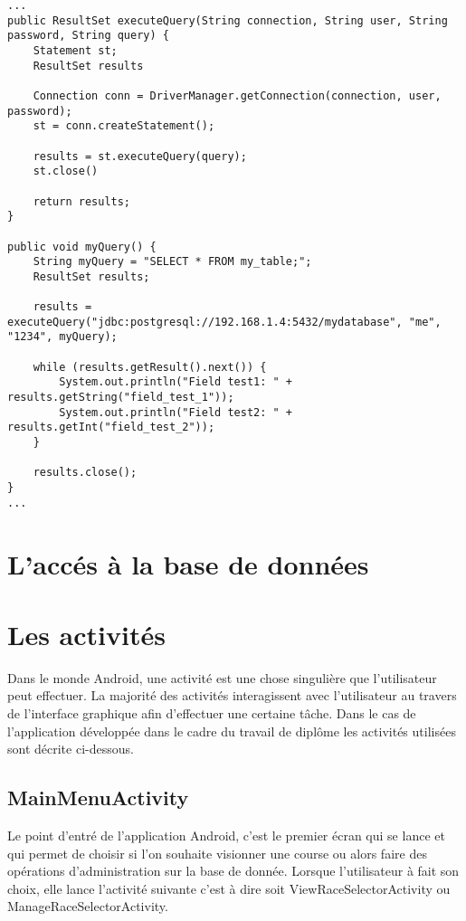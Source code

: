 \begin{lstlisting}[style=JavaStyle]
...
public ResultSet executeQuery(String connection, String user, String password, String query) {
	Statement st;
	ResultSet results

	Connection conn = DriverManager.getConnection(connection, user, password);
	st = conn.createStatement();
	
	results = st.executeQuery(query);
	st.close()	
	
	return results;
}

public void myQuery() {
	String myQuery = "SELECT * FROM my_table;";
	ResultSet results;
	
	results = executeQuery("jdbc:postgresql://192.168.1.4:5432/mydatabase", "me", "1234", myQuery);
	
	while (results.getResult().next()) {
		System.out.println("Field test1: " + results.getString("field_test_1"));
		System.out.println("Field test2: " + results.getInt("field_test_2"));
	}
	
	results.close();	
}
...
\end{lstlisting}

\section{L'accés à la base de données}


\section{Les activités}

Dans le monde Android, une activité est une chose singulière que l'utilisateur peut effectuer. La majorité des activités interagissent avec l'utilisateur au travers de l'interface graphique afin d'effectuer une certaine tâche.  Dans le cas de l'application développée dans le cadre du travail de diplôme les activités utilisées sont décrite ci-dessous.

\subsection{MainMenuActivity}

Le point d'entré de l'application Android, c'est le premier écran qui se lance et qui permet de choisir si l'on souhaite visionner une course ou alors faire des opérations d'administration sur la base de donnée. Lorsque l'utilisateur à fait son choix, elle lance l'activité suivante c'est à dire soit ViewRaceSelectorActivity ou ManageRaceSelectorActivity.

